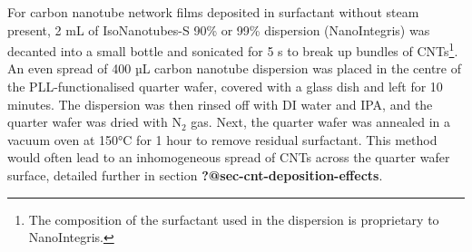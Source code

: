 \documentclass[
  a4paper,
]{scrbook}
\begin{document}
For carbon nanotube network films deposited in surfactant without steam
present, 2 mL of IsoNanotubes-S 90\% or 99\% dispersion (NanoIntegris)
was decanted into a small bottle and sonicated for 5 s to break up
bundles of CNTs\footnote{The composition of the surfactant used in the
  dispersion is proprietary to NanoIntegris.}. An even spread of 400 µL
carbon nanotube dispersion was placed in the centre of the
PLL-functionalised quarter wafer, covered with a glass dish and left for
10 minutes. The dispersion was then rinsed off with DI water and IPA,
and the quarter wafer was dried with N\(_2\) gas. Next, the quarter
wafer was annealed in a vacuum oven at 150°C for 1 hour to remove
residual surfactant. This method would often lead to an inhomogeneous
spread of CNTs across the quarter wafer surface, detailed further in
section \textbf{?@sec-cnt-deposition-effects}.
\end{document}
